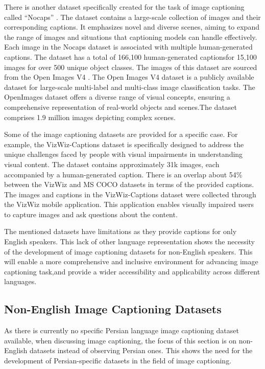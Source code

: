 \documentclass[runningheads]{llncs}
\begin{document}
There is another dataset specifically created for the task of image captioning called ``Nocaps'' \cite{Nocaps}. The dataset contains a large-scale collection of images and their corresponding captions. It emphasizes novel and diverse scenes, aiming to expand the range of images and situations that captioning models can handle effectively. Each image in the Nocaps dataset is associated with multiple human-generated captions. The dataset has a total of 166,100 human-generated captionsfor 15,100 images for over 500 unique object classes. The images of this dataset are sourced from the Open Images V4 \cite{Openimages}. The Open Images V4 dataset is a publicly available dataset for large-scale multi-label and multi-class image classification tasks. The OpenImages dataset offers a diverse range of visual concepts, ensuring a comprehensive representation of real-world objects and scenes.The dataset comprises 1.9 million images depicting complex scenes.

Some of the image captioning datasets are provided for a specific case. For example, the VizWiz-Captions dataset \cite{VizWiz} is specifically designed to address the unique challenges faced by people with visual impairments in understanding visual content. The dataset contains approximately 31k images, each accompanied by a human-generated caption. 
There is an overlap about 54\% between the VizWiz and MS COCO datasets in terms of the provided captions. The images and captions in the VizWiz-Captions dataset were collected through the VizWiz mobile application. This application enables visually impaired users to capture images and ask questions about the content.

The mentioned datasets have limitations as they provide captions for only English speakers. This lack of other language representation shows the necessity of the development of image captioning datasets for non-English speakers. This will enable a more comprehensive and inclusive environment for advancing image captioning task,and provide a wider accessibility and applicability across different languages.

\subsection{Non-English Image Captioning Datasets}
As there is currently no specific Persian language image captioning dataset available, when discussing image captioning, the focus of this section is on non-English datasets instead of observing Persian ones. This shows the need for the development of Persian-specific datasets in the field of image captioning.
\end{document}
